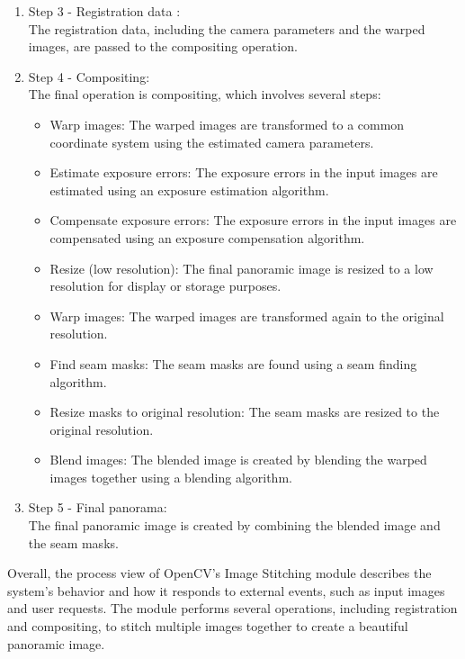 \begin{enumerate}
    \item Step 3 - Registration data :\\ The registration data, including the camera parameters and the warped images, are passed to the compositing operation.

    \item Step 4 - Compositing:\\ The final operation is compositing, which involves several steps:
    \begin{itemize}
        \item Warp images: The warped images are transformed to a common coordinate system using the estimated camera parameters.
        \item Estimate exposure errors: The exposure errors in the input images are estimated using an exposure estimation algorithm.
        \item Compensate exposure errors: The exposure errors in the input images are compensated using an exposure compensation algorithm.
        \item Resize (low resolution): The final panoramic image is resized to a low resolution for display or storage purposes.
        \item Warp images: The warped images are transformed again to the original resolution.
        \item Find seam masks: The seam masks are found using a seam finding algorithm.
        \item Resize masks to original resolution: The seam masks are resized to the original resolution.
        \item Blend images: The blended image is created by blending the warped images together using a blending algorithm.
    \end{itemize}
    \item Step 5 - Final panorama:\\ The final panoramic image is created by combining the blended image and the seam masks.
\end{enumerate}
Overall, the process view of OpenCV's Image Stitching module describes the system's behavior and how it responds to external events, such as input images and user requests. The module performs several operations, including registration and compositing, to stitch multiple images together to create a beautiful panoramic image.
\pagebreak

